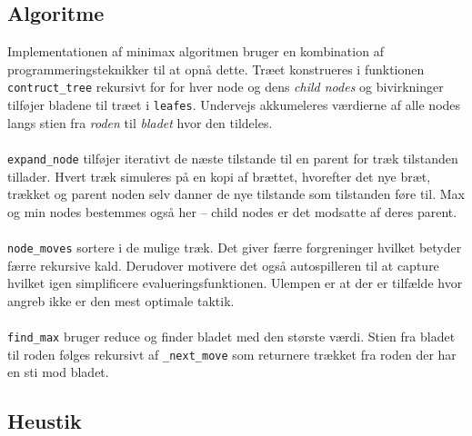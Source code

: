 \subsection{Algoritme}
Implementationen af minimax algoritmen bruger en kombination af programmeringsteknikker til at opnå dette.
Træet konstrueres i funktionen \texttt{contruct\_tree} rekursivt for for hver node og dens \textit{child nodes}
og bivirkninger tilføjer bladene til træet i \texttt{leafes}. Undervejs akkumeleres værdierne af 
alle nodes langs stien fra \textit{roden} til \textit{bladet} hvor den tildeles.\\
\\
\texttt{expand\_node} tilføjer iterativt de næste tilstande til en parent for træk tilstanden
tillader. Hvert træk simuleres på en kopi af brættet, hvorefter det nye bræt, trækket og parent noden
selv danner de nye tilstande som tilstanden føre til. Max og min nodes bestemmes også her -- child nodes
er det modsatte af deres parent.\\
\\
\texttt{node\_moves} sortere i de mulige træk. Det giver færre forgreninger hvilket betyder færre rekursive kald.
Derudover motivere det også autospilleren til at capture hvilket igen simplificere evalueringsfunktionen.
Ulempen er at der er tilfælde hvor angreb ikke er den mest optimale taktik.\\
\\
\texttt{find\_max} bruger reduce og finder bladet med den største værdi. Stien fra bladet til
roden følges rekursivt af \texttt{\_next\_move} som returnere trækket fra roden der har en sti
mod bladet.

\subsection{Heustik}



